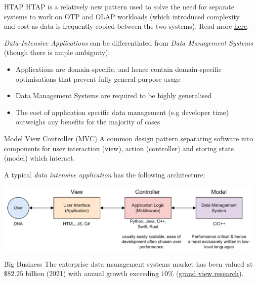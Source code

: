 \begin{sidenotebox}{HTAP}
    HTAP is a relatively new pattern used to solve the need for separate systems to work on OTP and OLAP workloads (which introduced complexity and cost as data is frequently copied between the two systems). Read more \href{https://en.wikipedia.org/wiki/Hybrid_transactional/analytical_processing}{here}.
\end{sidenotebox}
\noindent
\textit{Data-Intensive Applications} can be differentiated from \textit{Data Management Systems} (though there is ample ambiguity):
\begin{itemize}
    \item Applications are domain-specific, and hence contain domain-specific optimisations that prevent fully general-purpose usage
    \item Data Management Systems are required to be highly generalised
    \item The cost of application specific data management (e.g developer time) outweighs any benefits for the majority of cases
\end{itemize}

\begin{definitionbox}{Model View Controller (MVC)}
    A common design pattern separating software into components for user interaction (view), action (controller) and storing state (model) which interact.
\end{definitionbox}

A typical \textit{data intensive application} has the following architecture:
\begin{center}
    \includegraphics[width=.9\textwidth]{introduction/images/application_architecture.drawio.png}
\end{center}

\begin{sidenotebox}{Big Business}
    The enterprise data management systems market has been valued at $\$82.25$ billion (2021) with annual growth exceeding $10\%$ (\href{https://www.grandviewresearch.com/industry-analysis/enterprise-data-management-market}{grand view research}).
\end{sidenotebox}

